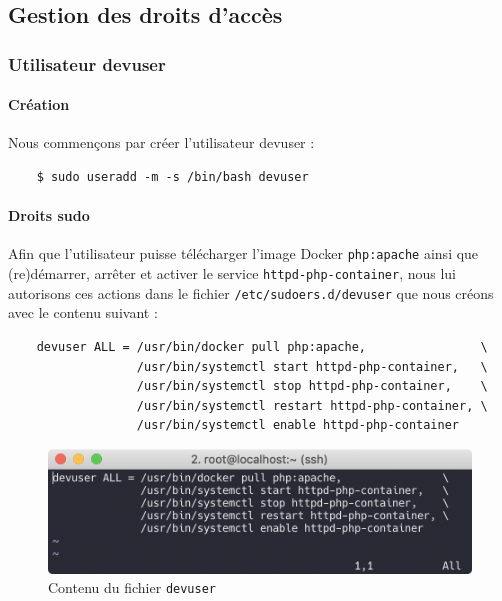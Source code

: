 \documentclass{extarticle} %
\begin{document}
    \pagebreak
    \subsection{Gestion des droits d'accès}
    \subsubsection{Utilisateur devuser}

    \paragraph{Création} Nous commençons par créer l'utilisateur devuser :

    \begin{verbatim}
    $ sudo useradd -m -s /bin/bash devuser
    \end{verbatim}

    \paragraph{Droits sudo} Afin que l'utilisateur puisse télécharger l'image Docker \texttt{php:apache}
     ainsi que (re)démarrer, arrêter et activer le service \texttt{httpd-php-container}, nous lui autorisons
     ces actions dans le fichier \texttt{/etc/sudoers.d/devuser} que nous créons avec le contenu suivant :

    \begin{verbatim}
    devuser ALL = /usr/bin/docker pull php:apache,                \
                  /usr/bin/systemctl start httpd-php-container,   \
                  /usr/bin/systemctl stop httpd-php-container,    \
                  /usr/bin/systemctl restart httpd-php-container, \
                  /usr/bin/systemctl enable httpd-php-container
    \end{verbatim}

    \begin{figure}[H]
      \centering
      \includegraphics[scale=0.7]{img/devuser.png}
      \caption{Contenu du fichier \texttt{devuser}}
    \end{figure}
\end{document}
